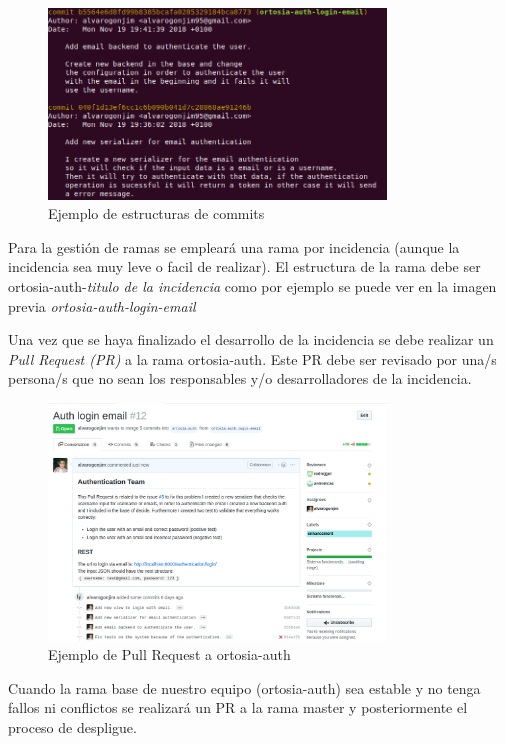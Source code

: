 \documentclass[12pt]{article}
\begin{document}
\begin{figure}[h]
\centering
\includegraphics[width=0.8\textwidth]{commits.png}
\caption{Ejemplo de estructuras de commits}
\end{figure}

\newpage
Para la gestión de ramas se empleará una rama por incidencia (aunque la incidencia sea muy leve o facil de realizar). El estructura de la rama debe ser ortosia-auth-\emph{titulo de la incidencia} como por ejemplo se puede ver en la imagen previa \emph{ortosia-auth-login-email}

Una vez que se haya finalizado el desarrollo de la incidencia se debe realizar un \emph{Pull Request (PR)} a la rama ortosia-auth. Este PR debe ser revisado por una/s persona/s que no sean los responsables y/o desarrolladores de la incidencia.

\begin{figure}[h]
\centering
\includegraphics[width=0.8\textwidth]{pr.png}
\caption{Ejemplo de Pull Request a ortosia-auth}
\end{figure}

Cuando la rama base de nuestro equipo (ortosia-auth) sea estable y no tenga  fallos ni conflictos se realizará un PR a la rama master y posteriormente el proceso de despligue. 
\end{document}
